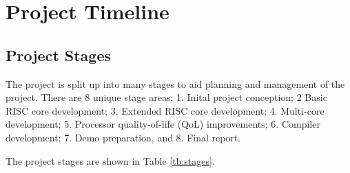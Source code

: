 \documentclass[11pt,a4paper]{report}
\begin{document}
{\section{Project Timeline}\label{sect:timeline}
\subsection{Project Stages}
The project is split up into many stages to aid planning and management of the project. There are 8 unique stage areas: 1. Inital project conception; 2 Basic RISC core development; 3. Extended RISC core development; 4. Multi-core development; 5. Processor quality-of-life (QoL) improvements; 6. Compiler development; 7. Demo preparation, and 8. Final report.

The project stages are shown in Table \ref{tb:stages}.

}
\end{document}
